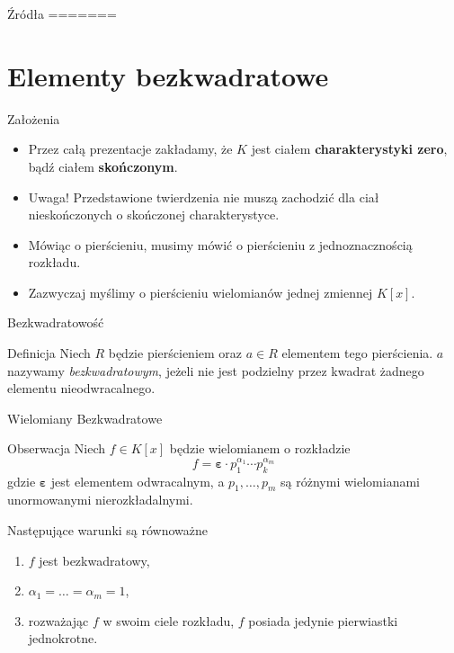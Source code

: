 \documentclass{beamer}
\renewcommand{\epsilon}{\bm{\varepsilon}}
\begin{document}
\begin{frame}{Źródła}
=======
\section{Elementy bezkwadratowe}
\begin{frame}{Założenia}
    \begin{itemize}
        \item Przez całą prezentacje zakładamy, że $K$ jest ciałem \textbf{charakterystyki zero}, bądź ciałem \textbf{skończonym}.
        \item Uwaga! Przedstawione twierdzenia nie muszą zachodzić dla ciał nieskończonych o skończonej charakterystyce.
        \item Mówiąc o pierścieniu, musimy mówić o pierścieniu z jednoznacznością rozkładu.
        \item Zazwyczaj myślimy o pierścieniu wielomianów jednej zmiennej $K[x]$.
    \end{itemize}
\end{frame}

\begin{frame}{Bezkwadratowość}
    \begin{block}{Definicja}
        Niech $R$ będzie pierścieniem oraz $a \in R$ elementem tego pierścienia. $a$ nazywamy \textit{bezkwadratowym}, jeżeli nie jest podzielny przez kwadrat żadnego elementu nieodwracalnego.
    \end{block}
\end{frame}

\begin{frame}{Wielomiany Bezkwadratowe}
    \begin{alertblock}{Obserwacja}
        Niech $f \in K[x]$ będzie wielomianem o rozkładzie 
        $$f = \epsilon \cdot p_1^{\alpha_1} \cdots p_k^{\alpha_m} $$ 
        gdzie $\epsilon$ jest elementem odwracalnym, a $p_1,\ldots, p_m$ są różnymi wielomianami unormowanymi nierozkładalnymi. 

        Następujące warunki są równoważne
        \begin{enumerate}
            \item $f$ jest bezkwadratowy,
            \item $\alpha_1 = \ldots = \alpha_m = 1$,
            \item rozważając $f$ w swoim ciele rozkładu, $f$ posiada jedynie pierwiastki jednokrotne.
        \end{enumerate}
    \end{alertblock}
\end{frame}


\end{frame}
\end{document}
